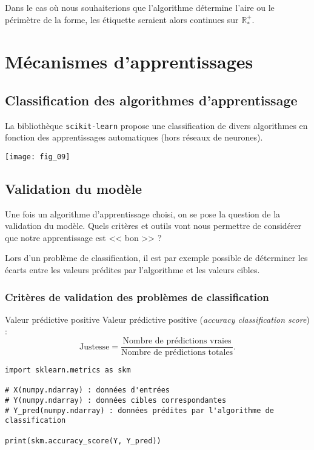\begin{exemple}
Dans le cas où nous souhaiterions que l'algorithme détermine l'aire ou le périmètre de la forme, les étiquette seraient alors continues sur $\mathbb{R}^{+}_{*}$.

\end{exemple}


\section{Mécanismes d'apprentissages}

\subsection{Classification des algorithmes d'apprentissage}

La bibliothèque \texttt{scikit-learn} propose une classification de divers algorithmes en fonction des apprentissages automatiques (hors réseaux de neurones).


\begin{center}
\texttt{[image: fig\_09]}
\end{center}


\subsection{Validation du modèle}
Une fois un algorithme d'apprentissage choisi, on se pose la question de la validation du modèle. Quels critères et outils vont nous permettre de considérer que notre apprentissage est << bon >> ?

Lors d'un problème de classification, il est par exemple possible de déterminer les écarts entre les valeurs prédites par l'algorithme et les valeurs cibles.

\subsubsection{Critères de validation des problèmes de classification}



\begin{defi}{Valeur prédictive positive}
Valeur prédictive positive (\textit{accuracy classification score}) :
$$
\text{Justesse} = \dfrac{\text{Nombre de prédictions vraies}}{\text{Nombre de prédictions totales}}.
$$
\end{defi}

\begin{lstlisting}
import sklearn.metrics as skm

# X(numpy.ndarray) : données d'entrées
# Y(numpy.ndarray) : données cibles correspondantes
# Y_pred(numpy.ndarray) : données prédites par l'algorithme de classification

print(skm.accuracy_score(Y, Y_pred))
\end{lstlisting}



